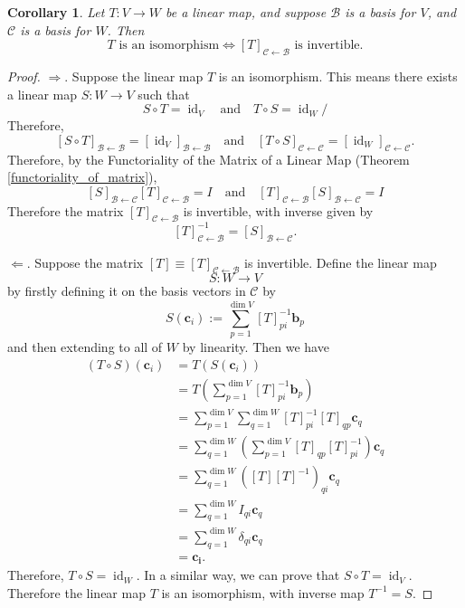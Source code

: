\documentclass[a4paper,11pt]{book}
\newtheorem{corollary}[theorem]{Corollary}
\theoremstyle{definition}
\newcommand{\ve}[1]{\mathbf{#1}}
\newcommand{\basis}[1]{{\mathcal #1}}
\DeclareMathOperator{\id}{id}
\begin{document}
\begin{corollary} \label{map-iso-matrix-iso}Let $T : V \rightarrow W$ be a linear map, and suppose $\basis{B}$ is a basis for $V$, and $\basis{C}$ is a basis for $W$. Then
\[
\mbox{$T$ is an isomorphism} \Longleftrightarrow \mbox{$[T]_{\basis{C} \leftarrow \basis{B}}$ is invertible.}
\]
\end{corollary}
\begin{proof} $\Rightarrow$. Suppose the linear map $T$ is an isomorphism.  This means there exists a linear map $S : W \rightarrow V$ such that
\[
 S \circ T = \id_V \quad \text{and} \quad T \circ S = \id_W/
\]
Therefore,
\[
  [S \circ T]_{\basis{B} \leftarrow \basis{B}} = [\id_V]_{\basis{B} \leftarrow \basis{B}} \quad \text{and} \quad [T \circ S]_{\basis{C} \leftarrow \basis{C}} = [\id_W]_{\basis{C} \leftarrow \basis{C}}.
\]
Therefore, by the Functoriality of the Matrix of a Linear Map (Theorem \ref{functoriality_of_matrix}), 
\[
 [S]_{\basis{B} \leftarrow \basis{C}} [T]_{\basis{C} \leftarrow \basis{B}} = I \quad \text{and} \quad [T]_{\basis{C} \leftarrow \basis{B}} [S]_{\basis{B} \leftarrow \basis{C}} = I
\]
Therefore the matrix $[T]_{\basis{C} \leftarrow \basis{B}}$ is invertible, with inverse given by 
\[
[T]^{-1}_{\basis{C} \leftarrow \basis{B}} = [S]_{\basis{B} \leftarrow \basis{C}}.
\]

$\Leftarrow$. Suppose the matrix $[T] \equiv [T]_{\basis{C} \leftarrow \basis{B}}$ is invertible. Define the linear map
\[
 S : W \rightarrow V
\]
by firstly defining it on the basis vectors in $\basis{C}$ by
\[
 S(\ve{c}_i) := \sum_{p=1}^{\dim V} [T]^{-1}_{pi} \ve{b}_p
\]
and then extending to all of $W$ by linearity. Then we have
\begin{align*}
 (T \circ S)(\ve{c}_i) &= T(S(\ve{c}_i)) \\
 &= T\left( \sum_{p=1}^{\dim V} [T]_{pi}^{-1} \ve{b}_p \right) \\
 &= \sum_{p=1}^{\dim V} \sum_{q=1}^{\dim W} [T]^{-1}_{pi} [T]_{qp} \ve{c}_q \\
 &= \sum_{q=1}^{\dim W} \left( \sum_{p=1}^{\dim V} [T]_{qp} [T]^{-1}_{pi} \right) \ve{c}_q \\
 &= \sum_{q=1}^{\dim W} \left( [T] [T]^{-1} \right)_{qi} \ve{c}_q \\
 &= \sum_{q=1}^{\dim W} I_{qi} \ve{c}_q \\
 &= \sum_{q=1}^{\dim W} \delta_{qi} \ve{c}_q \\
 &= \ve{c_i}.
\end{align*}
Therefore, $T \circ S = \id_W$. In a similar way, we can prove that $S \circ T = \id_V$. Therefore the linear map $T$ is an isomorphism, with inverse map $T^{-1} = S$.
\end{proof}
\end{document}
